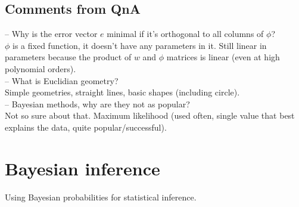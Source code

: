 \documentclass[a4paper,11pt]{article}
\begin{document}
	\subsection{Comments from QnA}
	-- Why is the error vector $e$ minimal if it's orthogonal to all columns of $\phi$?\vspace{3pt}\\
	$\phi$ is a fixed function, it doesn't have any parameters in it. Still linear in parameters because the product of $w$ and $\phi$ matrices is linear (even at high polynomial orders).\vspace{5pt}\\
	-- What is Euclidian geometry?\vspace{3pt}\\
	Simple geometries, straight lines, basic shapes (including circle).\vspace{5pt}\\
	-- Bayesian methods, why are they not as popular?\vspace{3pt}\\
	Not so sure about that. Maximum likelihood (used often, single value that best explains the data, quite popular/successful).
	
\section{Bayesian inference}
Using Bayesian probabilities for statistical inference.  
\end{document}
